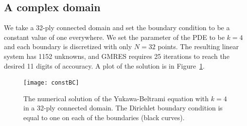 \documentclass[final]{siamltex}
\begin{document}
\subsection*{A complex domain}
We take a 32-ply connected domain and set the boundary condition to be a
constant value of one everywhere.  We set the parameter of the PDE to be
$k=4$ and each boundary is discretized with only $N=32$ points.  The
resulting linear system has 1152 unknowns, and GMRES requires 25
iterations to reach the desired 11 digits of accouracy.  A plot of the
solution is in Figure~\ref{f:32ply}.

\begin{figure}
  \centering
  \texttt{[image: constBC]}
  \caption{\label{f:32ply} The numerical solution of the Yukawa-Beltrami
  equation with $k=4$ in a 32-ply connected domain.  The Dirichlet
  boundary condition is equal to one on each of the boundaries (black
  curves).}
\end{figure}


%







\end{document}
